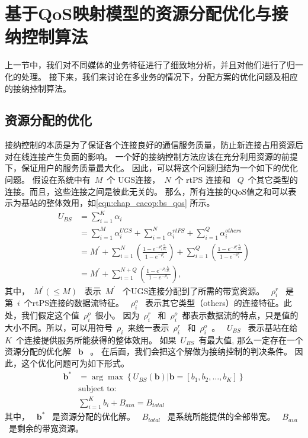 \section{基于QoS映射模型的资源分配优化与接纳控制算法}
上一节中，我们对不同媒体的业务特征进行了细致地分析，并且对他们进行了归一化的处理。
接下来，我们来讨论在多业务的情况下，分配方案的优化问题及相应的接纳控制算法。
\subsection{资源分配的优化}

接纳控制的本质是为了保证各个连接良好的通信服务质量，防止新连接占用资源后对在线连接产生负面的影响。
一个好的接纳控制方法应该在充分利用资源的前提下，保证用户的服务质量最大化。
因此，可以将这个问题归结为一个如下的优化问题。
假设在系统中有~$M$~个 UGS连接，~$N$~个 rtPS 连接和 ~$Q$~个其它类型的连接。而且，这些连接之间是彼此无关的。
那么，所有连接的QoS值之和可以表示为基站的整体效用，如\eqref{eqn:chap_cacop:bs_qos} 所示。
\begin{align}
U_{BS} &= \displaystyle \sum_{i=1}^K \alpha_i \nonumber \\
&= \sum_{i=1}^M\alpha_i^{UGS} + \sum_{i=1}^N\alpha_i^{rtPS} + \sum_{i=1}^Q\alpha_i^{others} \nonumber \\
&=\displaystyle M^\prime + \sum_{i=1}^N \left( \frac{1- e^{-\rho_i^r
\frac{b_i}{B_i} }}{1-e^{-\rho_i^r}} \right)
 + \sum_{i=1}^Q \left( \frac{1- e^{-\rho_i^o
\frac{b_i}{B_i} }}{1-e^{-\rho_i^o}} \right) \nonumber \\
&=\displaystyle M^\prime + \sum_{i=1}^{N+Q} \left( \frac{1- e^{-\rho_i
\frac{b_i}{B_i} }}{1-e^{-\rho_i}} \right), 
\label{eqn:chap_cacop:bs_qos}
\end{align}
其中，~$M^\prime(\le M)$~ 表示~$M^\prime$~ 个UGS连接分配到了所需的带宽资源。
~$\rho_i^r$~ 是第~$i$~个rtPS连接的数据流特征。 
~$\rho_i^o$~ 表示其它类型（others）的连接特征。此处，我们假定这个值~$\rho_i^o$~很小。
因为~$\rho_i^r$~ 和~$\rho_i^o$~都表示数据流的特点，只是值的大小不同。所以，可以用符号~$\rho_i$~来统一表示~$\rho_i^r$~ 和~$\rho_i^o$~。
~$U_{BS}$~ 表示基站在给~$K$~个连接提供服务所能获得的整体效用。
如果~$U_{BS}$~有最大值, 那么一定存在一个资源分配的优化解
~$\mathbf{b}$~ 。
在后面，我们会把这个解做为接纳控制的判决条件。
因此，这个优化问题可为如下形式。
\begin{align}
\mathbf{b}^* &= \arg \max \left\{ U_{BS}(\mathbf{b}) \big| \mathbf{b} = [b_1, b_2, \dots, b_K] \right\} \label{eqn_u_bs_qos}\\
&\text{subject to:}\nonumber\\
&\displaystyle\sum_{i=1}^{K}b_i + B_{ava}= B_{total} \nonumber
\end{align}
其中， ~$\mathbf{b}^*$~ 是资源分配的优化解。
~$B_{total}$~ 是系统所能提供的全部带宽。
~$ B_{ava} $~是剩余的带宽资源。

